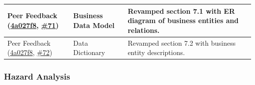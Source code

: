 \documentclass{article}
\begin{document}
\begin{longtable}{|>{\raggedright\arraybackslash}p{}|>{\raggedright\arraybackslash}p{}|>{\raggedright\arraybackslash}p{}|}
\hline
Peer Feedback (\href{https://github.com/VirochaanRG/MES-Event-Management-System/commit/4a027f855641707b69687eab03ff4d65efe1a0df}{4a027f8}, \href{https://github.com/VirochaanRG/MES-Event-Management-System/issues/71}{\#71}) & Business Data Model & Revamped section 7.1 with ER diagram of business entities and relations.\\
\hline
Peer Feedback (\href{https://github.com/VirochaanRG/MES-Event-Management-System/commit/4a027f855641707b69687eab03ff4d65efe1a0df}{4a027f8}, \href{https://github.com/VirochaanRG/MES-Event-Management-System/issues/72}{\#72}) & Data Dictionary & Revamped section 7.2 with business entity descriptions.\\
\hline
\end{longtable}

\subsubsection{Hazard Analysis}
\end{document}
